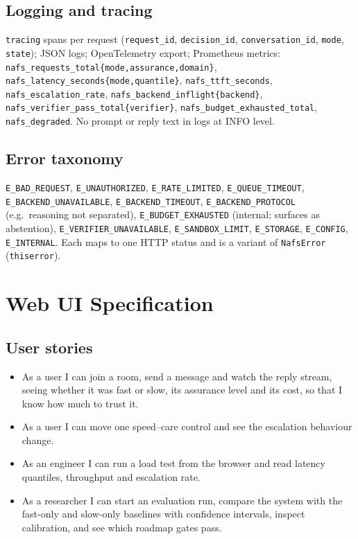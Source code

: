 \documentclass[11pt,a4paper]{article}
\begin{document}
\subsection{Logging and tracing}
\begin{sloppypar}\texttt{tracing} spans per request (\texttt{request\_id}, \texttt{decision\_id}, \texttt{conversation\_id}, \texttt{mode}, \texttt{state}); JSON logs; OpenTelemetry export; Prometheus metrics: \texttt{nafs\_requests\_total\{mode,assurance,domain\}}, \texttt{nafs\_latency\_seconds\{mode,quantile\}}, \texttt{nafs\_ttft\_seconds}, \texttt{nafs\_escalation\_rate}, \texttt{nafs\_backend\_inflight\{backend\}}, \texttt{nafs\_verifier\_pass\_total\{verifier\}}, \texttt{nafs\_budget\_exhausted\_total}, \texttt{nafs\_degraded}. No prompt or reply text in logs at INFO level.\end{sloppypar}
\subsection{Error taxonomy}
\begin{sloppypar}\texttt{E\_BAD\_REQUEST}, \texttt{E\_UNAUTHORIZED}, \texttt{E\_RATE\_LIMITED}, \texttt{E\_QUEUE\_TIMEOUT}, \texttt{E\_BACKEND\_UNAVAILABLE}, \texttt{E\_BACKEND\_TIMEOUT}, \texttt{E\_BACKEND\_PROTOCOL} (e.g.\ reasoning not separated), \texttt{E\_BUDGET\_EXHAUSTED} (internal; surfaces as abstention), \texttt{E\_VERIFIER\_UNAVAILABLE}, \texttt{E\_SANDBOX\_LIMIT}, \texttt{E\_STORAGE}, \texttt{E\_CONFIG}, \texttt{E\_INTERNAL}. Each maps to one HTTP status and is a variant of \texttt{NafsError} (\texttt{thiserror}).\end{sloppypar}

\section{Web UI Specification}
\label{sec:ui}
\subsection{User stories}
\begin{itemize}
\item As a user I can join a room, send a message and watch the reply stream, seeing whether it was fast or slow, its assurance level and its cost, so that I know how much to trust it.
\item As a user I can move one speed--care control and see the escalation behaviour change.
\item As an engineer I can run a load test from the browser and read latency quantiles, throughput and escalation rate.
\item As a researcher I can start an evaluation run, compare the system with the fast-only and slow-only baselines with confidence intervals, inspect calibration, and see which roadmap gates pass.
\end{itemize}
\end{document}
